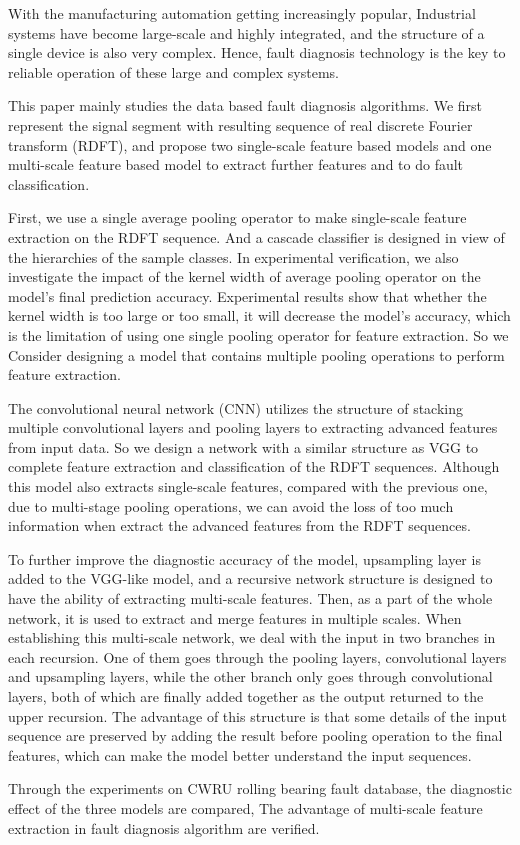 \begin{eabstract}
  With the manufacturing automation getting increasingly popular,
  Industrial systems have become large-scale and highly integrated,
  and the structure of a single device is also very complex. Hence,
  fault diagnosis technology is the key to reliable operation of
  these large and complex systems.

  This paper mainly studies the data based fault diagnosis algorithms.
  We first represent the signal segment with resulting sequence of real
  discrete Fourier transform (RDFT), and propose two single-scale
  feature based models and one multi-scale feature based model to
  extract further features and to do fault classification.

  First, we use a single average pooling operator to make single-scale
  feature extraction on the RDFT sequence. And a cascade classifier is
  designed in view of the hierarchies of the sample classes.
  In experimental verification, we also investigate the impact of the
  kernel width of average pooling operator on the model's final prediction
  accuracy. Experimental results show that whether the kernel width is
  too large or too small, it will decrease the model's accuracy, which is the
  limitation of using one single pooling operator for feature extraction.
  So we Consider designing a model that contains multiple pooling operations
  to perform feature extraction.

  The convolutional neural network (CNN) utilizes the structure of stacking
  multiple convolutional layers and pooling layers to extracting advanced 
  features from input data. So we design a network with a similar structure
  as VGG to complete feature extraction and classification of the RDFT sequences.
  Although this model also extracts single-scale features, compared with the
  previous one, due to multi-stage pooling operations, we can avoid the loss
  of too much information when extract the advanced features from the RDFT
  sequences.

  To further improve the diagnostic accuracy of the model, upsampling layer is
  added to the VGG-like model, and a recursive network structure is designed to
  have the ability of extracting multi-scale features. Then, as a part of the 
  whole network, it is used to extract and merge features in multiple scales.
  When establishing this multi-scale network, we deal with the input in two
  branches in each recursion. One of them goes through the pooling layers,
  convolutional layers and upsampling layers, while the other branch only goes
  through convolutional layers, both of which are finally added together as the
  output returned to the upper recursion. The advantage of this structure is
  that some details of the input sequence are preserved by adding the result
  before pooling operation to the final features, which can make the model
  better understand the input sequences.

  Through the experiments on CWRU rolling bearing fault database, the diagnostic
  effect of the three models are compared, The advantage of multi-scale feature
  extraction in fault diagnosis algorithm are verified.
\end{eabstract}

